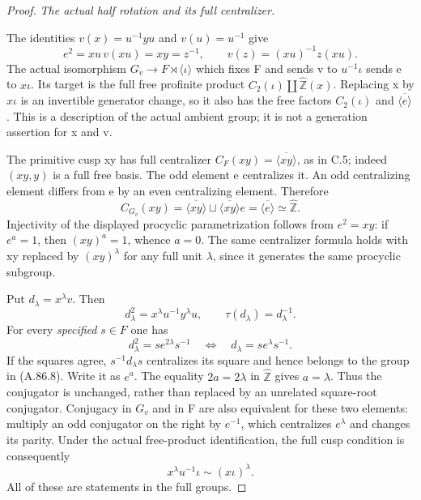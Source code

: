 \begin{proof}
\emph{The actual half rotation and its full centralizer.}\par
The identities \(v(x)=u^{-1}yu\) and \(v(u)=u^{-1}\) give
\[
 e^2=xu\,v(xu)=xy=z^{-1},\qquad
 v(z)=(xu)^{-1}z(xu).
 \tag{A.86.7}
\]
The actual isomorphism \(G_v\to F\rtimes\langle\iota\rangle\)
which fixes F and sends v to \(u^{-1}\iota\) sends e to
\(x\iota\). Its target is the full free profinite product
\(C_2(\iota)\amalg\widehat{\mathbb Z}(x)\).
Replacing x by \(x\iota\) is an invertible generator change,
so it also has the free factors \(C_2(\iota)\) and
\(\overline{\langle e\rangle}\). This is a description of
the actual ambient group; it is not a generation assertion for x and v.

The primitive cusp xy has full centralizer
\(C_F(xy)=\overline{\langle xy\rangle}\), as in C.5;
indeed \((xy,y)\) is a full free basis. The odd element e centralizes
it. An odd centralizing element differs from e by an even centralizing
element. Therefore
\[
 C_{G_v}(xy)=
 \overline{\langle xy\rangle}\sqcup
 \overline{\langle xy\rangle}e
 =\overline{\langle e\rangle}\simeq\widehat{\mathbb Z}.
 \tag{A.86.8}
\]
Injectivity of the displayed procyclic parametrization follows from
\(e^2=xy\): if \(e^a=1\), then \((xy)^a=1\), whence
\(a=0\). The same centralizer formula holds with xy replaced by
\((xy)^\lambda\) for any full unit \(\lambda\), since it
generates the same procyclic subgroup.

Put \(d_\lambda=x^\lambda v\). Then
\[
 d_\lambda^2=x^\lambda u^{-1}y^\lambda u,
 \qquad\tau(d_\lambda)=d_\lambda^{-1}.
 \tag{A.86.9}
\]
For every \emph{specified} \(s\in F\) one has
\[
 d_\lambda^2=s e^{2\lambda}s^{-1}
       \quad\Longleftrightarrow\quad
 d_\lambda=s e^\lambda s^{-1}.
 \tag{A.86.10}
\]
If the squares agree, \(s^{-1}d_\lambda s\) centralizes its
square and hence belongs to the group in (A.86.8). Write it as
\(e^a\). The equality \(2a=2\lambda\) in
\(\widehat{\mathbb Z}\) gives \(a=\lambda\). Thus the
conjugator is unchanged, rather than replaced by an unrelated
square-root conjugator. Conjugacy in \(G_v\) and in F are also
equivalent for these two elements: multiply an odd conjugator on
the right by \(e^{-1}\), which centralizes \(e^\lambda\)
and changes its parity. Under the actual free-product identification,
the full cusp condition is consequently
\[
       x^\lambda u^{-1}\iota\sim (x\iota)^\lambda.
 \tag{A.86.11}
\]
All of these are statements in the full groups.


\end{proof}
